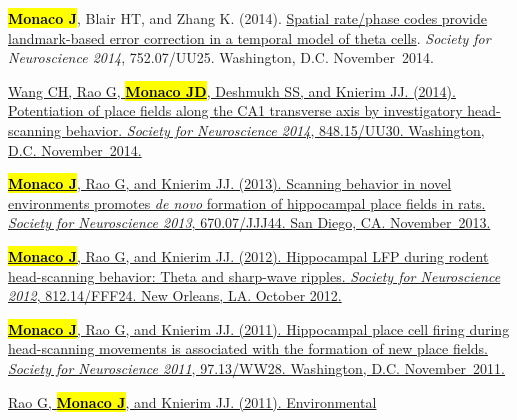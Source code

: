 \documentclass[10pt]{article}
\newcommand{\itemtitle}[1]{{\color{hopkinsblue}\ul{#1}}}
\newcommand{\joehl}[1]{\hl{\textbf{#1}}}
\begin{document}
\begin{description}
    {\joehl{Monaco J}, Blair HT, and Zhang K. (2014). \itemtitle{Spatial
        rate/phase codes provide landmark-based error correction in a temporal
      model of theta cells}. \emph{Society for Neuroscience 2014}, 752.07/UU25.
    Washington, D.C. November~2014.}
  \item[\quad]
    \href{http://www.abstractsonline.com/Plan/ViewAbstract.aspx?sKey=bfb59866-8deb-44a6-9515-a7aab630507b&cKey=d201b3aa-7725-452e-b0dd-c41d204b5b54&mKey=54c85d94-6d69-4b09-afaa-502c0e680ca7}
    {Wang CH, Rao G, \joehl{Monaco JD}, Deshmukh SS, and Knierim JJ. (2014).
    \itemtitle{Potentiation of place fields along the CA1 transverse axis by
      investigatory head-scanning behavior}. \emph{Society for Neuroscience 2014},
    848.15/UU30. Washington, D.C. November~2014.}
  \item[\quad]
    \href{http://www.abstractsonline.com/Plan/ViewAbstract.aspx?sKey=32eccac1-4e1d-4e81-bf5c-f39bcb605757&cKey=4710dece-cc8e-4b48-8764-49ea174b91ef&mKey=8d2a5bec-4825-4cd6-9439-b42bb151d1cf}
    {\joehl{Monaco J}, Rao G, and Knierim JJ. (2013). \itemtitle{Scanning
        behavior in novel environments promotes \emph{de novo} formation of
      hippocampal place fields in rats}. \emph{Society for Neuroscience 2013},
    670.07/JJJ44. San Diego, CA. November~2013.}
  \item[\quad]
    \href{http://www.abstractsonline.com/Plan/ViewAbstract.aspx?sKey=f5b9fa94-7d15-48c7-9d67-b89cd2883025&cKey=a53349ca-41b1-4664-b022-85d0d1fe59b8&mKey=70007181-01C9-4DE9-A0A2-EEBFA14CD9F1}
    {\joehl{Monaco J}, Rao G, and Knierim JJ. (2012). \itemtitle{Hippocampal
      LFP during rodent head-scanning behavior: Theta and sharp-wave ripples}.
      \emph{Society for Neuroscience 2012}, 812.14/FFF24. New Orleans, LA. October
    2012.}
  \item[\quad]
    \href{http://www.abstractsonline.com/Plan/ViewAbstract.aspx?sKey=c48e9f5f-1274-4486-85bf-38ee591629e1&cKey=190bd951-c183-428d-a4c5-01eb61556d79&mKey=8334BE29-8911-4991-8C31-32B32DD5E6C8}
    {\joehl{Monaco J}, Rao G, and Knierim JJ. (2011). \itemtitle{Hippocampal
        place cell firing during head-scanning movements is associated with the
      formation of new place fields}. \emph{Society for Neuroscience 2011},
    97.13/WW28. Washington, D.C. November~2011.}
  \item[\quad]
    \href{http://www.abstractsonline.com/Plan/ViewAbstract.aspx?sKey=c48e9f5f-1274-4486-85bf-38ee591629e1&cKey=3ec26e6f-8c59-4be2-bad3-e1572d75e07e&mKey=8334BE29-8911-4991-8C31-32B32DD5E6C8}
    {Rao G, \joehl{Monaco J}, and Knierim JJ. (2011). \itemtitle{Environmental
}}
\end{description}
\end{document}
